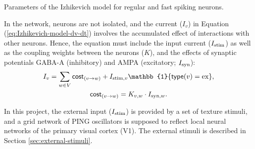 \begin{table}[!htp] 
    \centering
    
    \caption{Parameters of the Izhikevich model for regular and fast spiking neurons.}
\label{tab:params-izhikevich-model}
\end{table}

In the network, neurons are not isolated, and the current ($I_v$) in Equation (\ref{eq:Izhikevich-model-dv-dt}) involves the accumulated effect of interactions with other neurons. Hence, the equation must include the input current ($I_{\mathrm{stim}}$) as well as the coupling weights between the neurons ($K$), and the effects of synaptic potentials GABA-A (inhibitory) and AMPA (excitatory; $I_{\mathrm{syn}}$):
\begin{gather}
    I_v = 
    \sum_{w \in V} \cost_{(v \to w)} + I_{\stim, v} \mathbb{1} \{ \type(v) = \ex \},  \label{eq:current-components} \\
    \cost_{(v \to w)} = K_{v, w} \cdot I_{\syn, w}. 
    \label{eq:cost-function}
\end{gather}

In this project, the external input ($I_{\mathrm{stim}}$) is provided by a set of texture stimuli, and a grid network of PING oscillators is supposed to reflect local neural networks of the primary visual cortex (V1). The external stimuli is described in Section \ref{sec:external-stimuli}.


